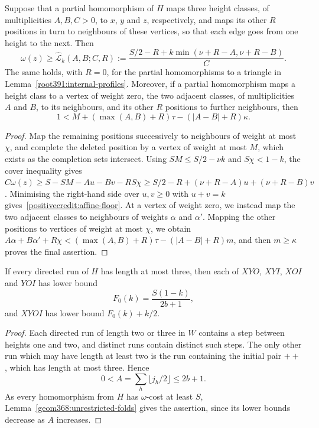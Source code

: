 \begin{lemma}
\label{root391:profile-floors}
Suppose that a partial homomorphism of $H$ maps three height
classes, of multiplicities $A,B,C>0$, to $x$, $y$ and $z$, respectively, and maps its other $R$ positions in turn to neighbours of these vertices, so that each edge goes from one height to the next. Then
\begin{equation}\label{positivecredit:affine-floor}
 \omega(z)\ge\widehat{\mathcal L}_k(A,B;C,R)
 :=\frac{S/2-R+k\min(\nu+R-A,\nu+R-B)}{C}.
\end{equation}
The same holds, with $R=0$, for the partial homomorphisms to a triangle in Lemma~\ref{root391:internal-profiles}. Moreover, if a partial homomorphism maps a height class to a vertex of weight zero, the two adjacent classes, of multiplicities $A$ and $B$, to its neighbours, and its other $R$ positions to further neighbours, then
\begin{equation}\label{root391:zero-profile-price}
 1<M+(\max(A,B)+R)\tau-(|A-B|+R)\kappa.
\end{equation}
\end{lemma}
\begin{proof}
Map the remaining positions successively to neighbours
of weight at most $\chi$, and complete the deleted position by a vertex of weight at most $M$, which exists as the completion sets intersect.
Using $SM\le S/2-\nu k$ and $S\chi<1-k$, the cover inequality gives $C\omega(z)\ge S-SM-Au-Bv-RS\chi \ge S/2-R+(\nu+R-A)u+(\nu+R-B)v$. Minimising the right-hand side over $u,v\ge0$ with $u+v=k$ gives~\eqref{positivecredit:affine-floor}. At a vertex of weight zero, we
instead map the two adjacent classes to neighbours of weights $\alpha$ and $\alpha'$. Mapping the other positions to vertices of weight at most $\chi$, we obtain $A\alpha+B\alpha'+R\chi <(\max(A,B)+R)\tau-(|A-B|+R)m$, and then $m\ge\kappa$ proves the final assertion.
\end{proof}

\begin{lemma}
\label{root391:short-run}
If every directed run of $H$ has length at most three, then each of
$XYO$, $XYI$, $XOI$ and $YOI$ has lower bound
\begin{equation}\label{completeheightthree:F}
 F_0(k)=\frac{S(1-k)}{2b+1},
\end{equation}
and $XYOI$ has lower bound $F_0(k)+k/2$.
\end{lemma}
\begin{proof}
Each directed run of length two or three in $W$ contains a step between heights one and two, and distinct runs contain distinct such steps. The only other run which may have length at least two is the run containing the initial pair $++$, which has length at most three. Hence
\[
 0<A=\sum_h\lfloor j_h/2\rfloor\le2b+1.
\]
As every homomorphism from $H$ has $\omega$-cost at least $S$,
Lemma~\ref{geom368:unrestricted-folds} gives the assertion, since its lower bounds decrease as $A$ increases.
\end{proof}

